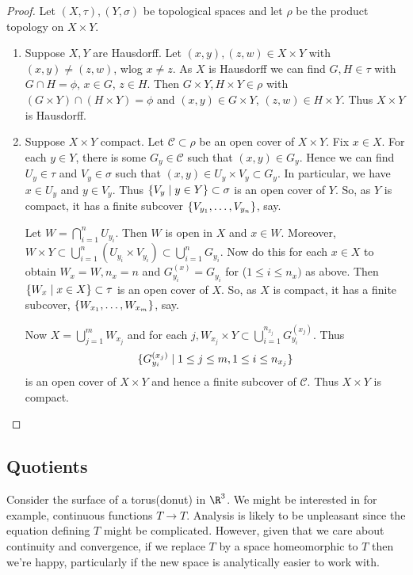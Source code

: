 \begin{proof}
Let $(X,\tau), (Y,\sigma)$ be topological spaces and let $\rho$ be the product topology on $X\times Y$.
\begin{enumerate}
    \item Suppose $X,Y$ are Hausdorff. Let $(x,y), (z,w)\in X\times Y$ with $(x,y)\neq (z,w)$, wlog $x\neq z$. As $X$ is Hausdorff we can find $G,H\in \tau$ with $G\cap H = \phi$, $x\in G$, $z\in H$. Then $G\times Y, H\times Y\in \rho$ with $(G\times Y)\cap (H\times Y) = \phi$ and $(x,y)\in G\times Y$, $(z,w) \in H\times Y$. Thus $X\times Y$ is Hausdorff.
    \item Suppose $X\times Y$ compact. Let $\mathcal{C}\subset\rho$ be an open cover of $X\times Y$. Fix $x \in X$. For each $y\in Y$, there is some $G_y\in \mathcal{C}$ such that $(x,y)\in G_y$. Hence we can find $U_y\in \tau$ and $V_y\in \sigma$ such that $(x,y)\in U_y\times V_y\subset G_y$. In particular, we have $x\in U_y$ and $y\in V_y$. Thus $\{V_y\mid y\in Y\}\subset \sigma$ is an open cover of $Y$. So, as $Y$ is compact, it has a finite subcover $\{V_{y_1},\dots, V_{y_n}\}$, say.
    
    Let $W = \bigcap_{i=1}^n U_{y_i}$. Then $W$ is open in $X$ and $x\in W$. Moreover, $W\times Y \subset \bigcup_{i=1}^n (U_{y_i}\times V_{y_i}) \subset \bigcup_{i=1}^n G_{y_i}$. Now do this for each $x\in X$ to obtain $W_x = W, n_x = n$ and $G_{y_i}^{(x)} = G_{y_i}$ for ($1 \leq i  \leq n_x)$ as above. Then $\{W_x\mid x\in X\}\subset \tau$ is an open cover of $X$. So, as $X$ is compact, it has a finite subcover, $\{W_{x_1},\dots , W_{x_m}\}$, say.
    
    Now $X = \bigcup_{j=1}^m W_{x_j}$ and for each $j, W_{x_j}\times Y\subset \bigcup_{i=1}^{n_{x_j}} G_{y_i}^{(x_j)}$. Thus \[\{G_{y_i}^{(x_j)}\mid1 \leq j \leq m, 1 \leq i \leq n_{x_j}\}\] is an open cover of $X\times Y$ and hence a finite subcover of $\mathcal{C}$. Thus $X\times Y$ is compact.
\end{enumerate}
\end{proof}
\subsection{Quotients}
Consider the surface of a torus(donut) in $\R^3$. We might be interested in for example, continuous functions $T\rightarrow T$. Analysis is likely to be unpleasant since the equation defining $T$ might be complicated. However, given that we care about continuity and convergence, if we replace $T$ by a space homeomorphic to $T$ then we're happy, particularly if the new space is analytically easier to work with.

